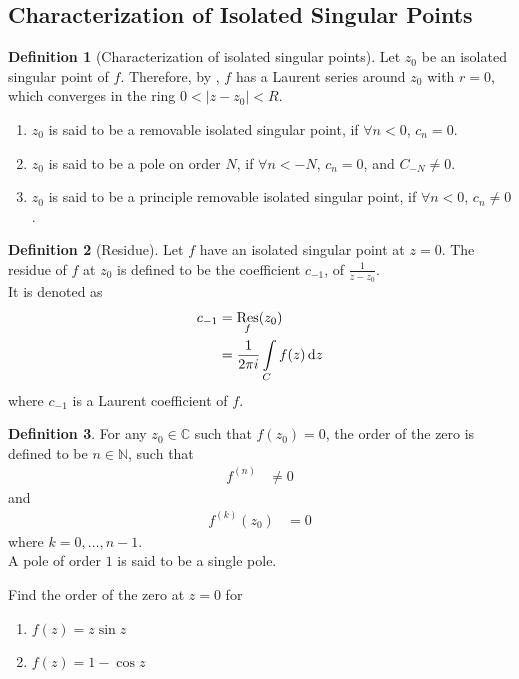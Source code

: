 \documentclass[titlepage, fleqn, a4paper, 12pt, twoside]{article}
\theoremstyle{definition}
\newtheorem{definition}{Definition}
\theoremstyle{theorem}
\DeclareMathOperator{\Res}{Res}
\begin{document}
\subsection{Characterization of Isolated Singular Points}

\begin{definition}[Characterization of isolated singular points]
	Let $z_0$ be an isolated singular point of $f$.
	Therefore, by , $f$ has a Laurent series around $z_0$ with $r = 0$, which converges in the ring $0 < |z - z_0| < R$.
	\begin{enumerate}
		\item
			$z_0$ is said to be a removable isolated singular point, if $\forall n < 0$, $c_n = 0$.
		\item
			$z_0$ is said to be a pole on order $N$, if $\forall n < -N$, $c_n = 0$, and $C_{-N} \neq 0$.
		\item
			$z_0$ is said to be a principle removable isolated singular point, if $\forall n < 0$, $c_n \neq 0$.
	\end{enumerate}
\end{definition}

\begin{definition}[Residue]
	Let $f$ have an isolated singular point at $z = 0$.
	The residue of $f$ at $z_0$ is defined to be the coefficient $c_{-1}$, of $\frac{1}{z - z_0}$.\\
	It is denoted as
	\begin{align*}
		c_{-1} & = \Res_{f}(z_0) \\
                       & = \frac{1}{2 \pi i} \int\limits_{C} f(z) \dif z
	\end{align*}
	where $c_{-1}$ is a Laurent coefficient of $f$.
\end{definition}

\begin{definition}
	For any $z_0 \in \mathbb{C}$ such that $f(z_0) = 0$, the order of the zero is defined to be $n \in \mathbb{N}$, such that
	\begin{align*}
		f^{(n)} & \neq 0
	\end{align*}
	and
	\begin{align*}
		f^{(k)}(z_0) & = 0
	\end{align*}
	where $k = 0,\dots,n - 1$.\\
	A pole of order $1$ is said to be a single pole.
\end{definition}

\begin{question}
	Find the order of the zero at $z = 0$ for
	\begin{enumerate}
		\item $f(z) = z \sin z$
		\item $f(z) = 1 - \cos z$
	\end{enumerate}
\end{question}
\end{document}
